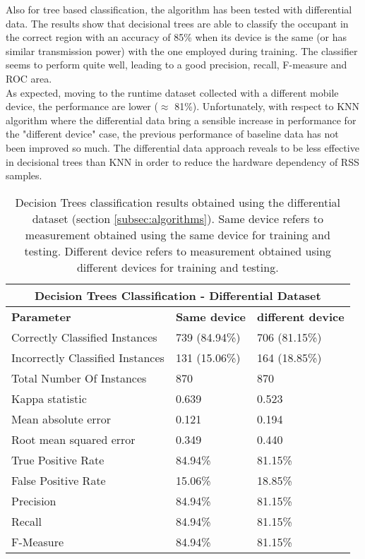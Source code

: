 Also for tree based classification, the algorithm has been tested with differential data.
The results show that decisional trees are able to classify the occupant in the correct region with an accuracy of 85\% when its device is the same (or has similar transmission power) with the one employed during training.
The classifier seems to perform quite well, leading to a good precision, recall, F-measure and ROC area.\\
As expected, moving to the runtime dataset collected with a different mobile device, the performance are lower ($\approx$ 81\%). Unfortunately, with respect to KNN algorithm where the differential data bring a sensible increase in performance for the "different device" case, the previous performance of baseline data has not been improved so much. The differential data approach reveals to be less effective in decisional trees than KNN in order to reduce the hardware dependency of RSS samples.

\begin{table}
\center
\caption[Decision Trees classification results obtained using the differential dataset.]{Decision Trees classification results obtained using the differential dataset (section \ref{subsec:algorithms}). Same device refers to measurement obtained using the same device for training and testing. Different device refers to measurement obtained using different devices for training and testing.}
\label{tab:tree-diff}
\begin{tabular}{ |l|l|l| }
  \hline
  \multicolumn{3}{|c|}{\textbf{Decision Trees Classification - Differential Dataset}} \\
  \hline
  \textbf{Parameter} & \textbf{Same device} & \textbf{different device}\\
  \hline
  Correctly Classified Instances & 739 (84.94\%) & 706 (81.15\%) \\
  Incorrectly Classified Instances & 131 (15.06\%) & 164 (18.85\%) \\
  Total Number Of Instances & 870 & 870 \\
  Kappa statistic & 0.639 & 0.523 \\
  Mean absolute error & 0.121 & 0.194 \\
  Root mean squared error & 0.349 & 0.440 \\
  True Positive Rate & 84.94\% & 81.15\% \\
  False Positive Rate & 15.06\% & 18.85\% \\
  Precision & 84.94\% & 81.15\% \\
  Recall & 84.94\% & 81.15\% \\
  F-Measure & 84.94\% & 81.15\% \\
  \hline
\end{tabular}
\end{table}

